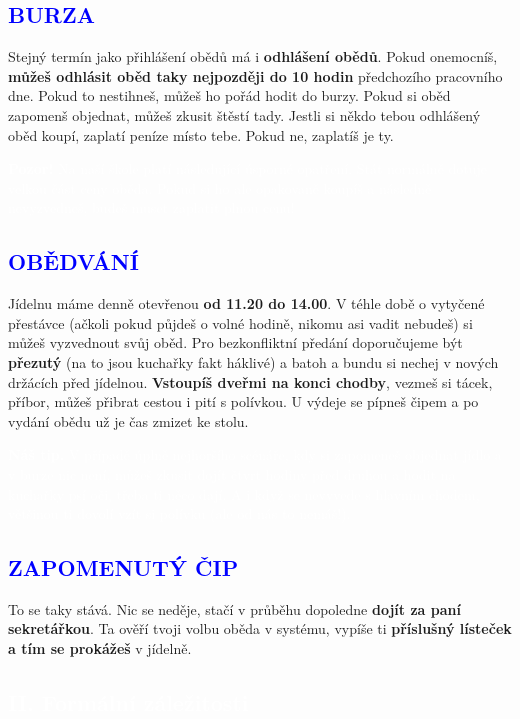 \documentclass[a5paper, twoside]{article}
\newcommand{\polonadpis}[4]{
  \vspace*{-50pt}
  \begin{tcolorbox}[colback = #2, boxrule = 0pt, grow to left by = #4,  grow to right by = #4, arc=8pt, height = 30pt]
    \vspace*{5pt}
    \centering \subsection*{\textcolor{#3}{#1}}
  \end{tcolorbox}
}
\newcommand{\podnadpis}[2]{
  \subsection*{\textcolor{#2}{#1}}
}
\begin{document}
\podnadpis{BURZA}{blue}
Stejný termín jako přihlášení obědů má i \textbf{odhlášení obědů}. Pokud onemocníš, \textbf{můžeš odhlásit oběd taky nejpozději do 10 hodin} předchozího pracovního dne. Pokud to nestihneš, můžeš ho pořád hodit do burzy. Pokud si oběd zapomenš objednat, můžeš zkusit štěstí tady. Jestli si někdo tebou odhlášený oběd koupí, zaplatí peníze místo tebe. Pokud ne, zaplatíš je ty.

\begin{bluebox}
	\textcolor{white}{
		\textbf{Pozor!} Na naší škole platí následující úsporné opatření. Stát normálně dotuje velkou část ceny oběda. Pokud si ho ale opakovaně koupíš a následně nevyzvedneš, budeš muset zaplatit plnou cenu!
	}
\end{bluebox}

\podnadpis{OBĚDVÁNÍ}{blue}
Jídelnu máme denně otevřenou \textbf{od 11.20 do 14.00}. V téhle době o vytyčené přestávce (ačkoli pokud půjdeš o volné hodině, nikomu asi vadit nebudeš) si můžeš vyzvednout svůj oběd. Pro bezkonfliktní předání doporučujeme být \textbf{přezutý} (na to jsou kuchařky fakt háklivé) a batoh a bundu si nechej v nových držácích před jídelnou. \textbf{Vstoupíš dveřmi na konci chodby}, vezmeš si tácek, příbor, můžeš přibrat cestou i pití s polívkou. U výdeje se pípneš čipem a po vydání obědu už je čas zmizet ke stolu.
\vspace{7pt}
\begin{bluebox}
	\textcolor{white}{
		\textbf{Náš tip.} V případě úplně nejhoršího scénáře, kdy si zapomeneš objednat jídlo a v burze nic není, můžeš zkusit dojít čtvrt hodiny před druhou a hodit na kuchařky psí oči, třeba ti něco dají. A i když se nevyvede s hlavním chodem, většinou ti dovolí vzít si polívku (ale od nás to nemáš!).}
\end{bluebox}

\podnadpis{ZAPOMENUTÝ ČIP}{blue}
To se taky stává. Nic se neděje, stačí v průběhu dopoledne \textbf{dojít za paní
	sekretářkou}. Ta ověří tvoji volbu oběda v systému, vypíše ti \textbf{příslušný lísteček
	a tím se prokážeš} v jídelně.

\pagebreak

\polonadpis{II. Formální záležitosti}{blue}{white}{-3.8cm}
\end{document}
